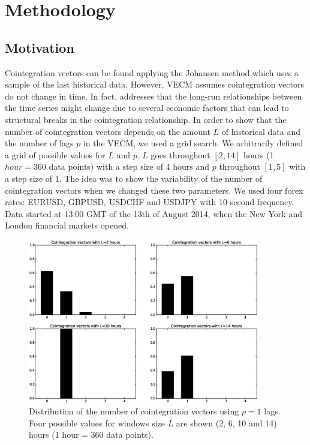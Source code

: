 \section{Methodology} \label{sec:51methodology}
\subsection{Motivation}

Cointegration vectors can be found applying the Johansen method which uses a
sample of the last historical data. However, VECM assumes cointegration vectors
do not change in time.  In fact, \cite{gregoryETal1996} addresses that the
long-run relationships between the time series  might change due to several
economic factors that can lead to structural breaks in the cointegration
relationship.  In order to show that the number of cointegration vectors depends
on the amount $L$ of historical data and the number of lags $p$ in the VECM, we
used a grid search.  We arbitrarily defined a grid of possible values for $L$
and $p$. $L$ goes throughout $[2,14]$ hours (1 $hour = 360$ data points) with a
step size of 4 hours and $p$ throughout $[1,5]$ with a step size of 1. The idea
was to show the variability of the number of cointegration vectors when we changed
these two parameters. We used four forex rates: EURUSD, GBPUSD, USDCHF and
USDJPY with 10-second frequency. Data started at 13:00 GMT of the 13th of August
2014, when the New York and London financial markets opened.

\begin{figure}[!h]
  \centering
   \includegraphics[width=0.9\textwidth]{img/51_Fig1}
  \caption{Distribution of the number of cointegration vectors using $p=1$ lags.
  Four possible values for windows size $L$ are shown (2, 6, 10 and 14) hours (1
  hour = 360 data points).}
  \label{fig:hists}
\end{figure}

